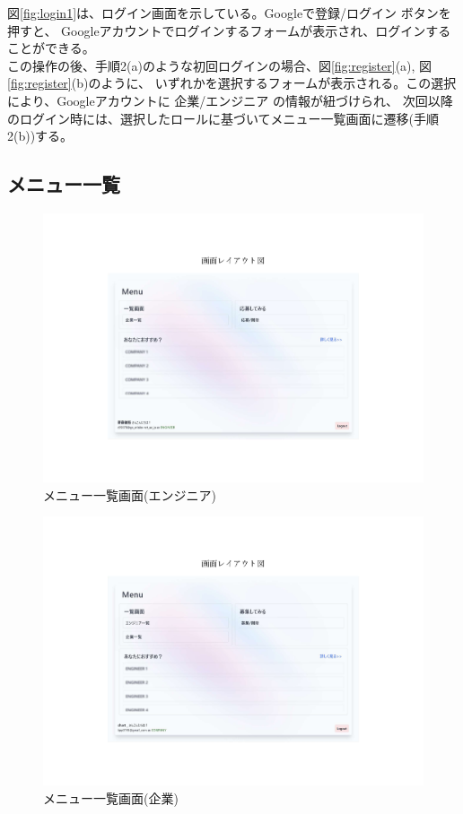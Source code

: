\documentclass[10pt]{ltjsarticle}
\begin{document}
図\ref{fig:login1}は、ログイン画面を示している。Googleで登録/ログイン ボタンを押すと、
Googleアカウントでログインするフォームが表示され、ログインすることができる。\\
\indent この操作の後、手順2(a)のような初回ログインの場合、図\ref{fig:register}(a), 図\ref{fig:register}(b)のように、
いずれかを選択するフォームが表示される。この選択により、Googleアカウントに 企業/エンジニア の情報が紐づけられ、
次回以降のログイン時には、選択したロールに基づいてメニュー一覧画面に遷移(手順2(b))する。
\newpage
\subsection{メニュー一覧}
\begin{figure}[H]
    \centering
    \includegraphics[trim=5.2cm 3.4cm 5.2cm 4.7cm, clip, width=13.5cm]{./img/menu_pages_engineer.pdf}
    \caption{メニュー一覧画面(エンジニア)}
    \label{fig:menu_engineer}
\end{figure}
\vspace{-.7cm}

\begin{figure}[H]
    \centering
    \includegraphics[trim=5.2cm 3.4cm 5.2cm 4.7cm, clip, width=13.5cm]{./img/menu_pages_company.pdf}
    \caption{メニュー一覧画面(企業)}
    \label{fig:menu_company}
\end{figure}
\vspace{-.5cm}
\end{document}
